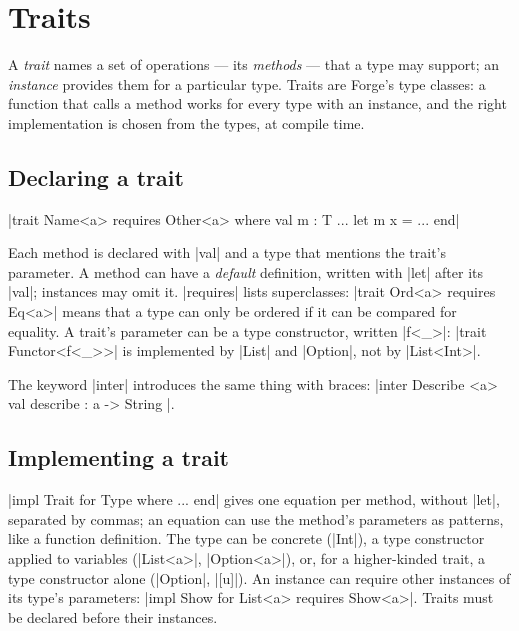 \chapter{Traits}
\label{ch:traits}

A \emph{trait} names a set of operations --- its \emph{methods} --- that a
type may support; an \emph{instance} provides them for a particular type.
Traits are Forge's type classes: a function that calls a method works for
every type with an instance, and the right implementation is chosen from the
types, at compile time.

\section{Declaring a trait}

\begin{center}
\fc|trait Name<a> requires Other<a> where val m : T ... let m x = ... end|
\end{center}

Each method is declared with \fc|val| and a type that mentions the trait's
parameter. A method can have a \emph{default} definition, written with
\fc|let| after its \fc|val|; instances may omit it. \fc|requires| lists
superclasses: \fc|trait Ord<a> requires Eq<a>| means that a type can only be
ordered if it can be compared for equality. A trait's parameter can be a
type constructor, written \fc|f<_>|: \fc|trait Functor<f<_>>| is implemented
by \fc|List| and \fc|Option|, not by \fc|List<Int>|.

The keyword \fc|inter| introduces the same thing with braces:
\fc|inter Describe <a> { val describe : a -> String }|.

\section{Implementing a trait}
\fc|impl Trait for Type where ... end| gives one equation per method, without
\fc|let|, separated by commas; an equation can use the method's parameters as
patterns, like a function definition. The type can be concrete (\fc|Int|), a
type constructor applied to variables (\fc|List<a>|, \fc|Option<a>|), or, for
a higher-kinded trait, a type constructor alone (\fc|Option|, \fc|[u]|).
An instance can require other instances of its type's parameters:
\fc|impl Show for List<a> requires Show<a>|. Traits must be declared before
their instances.

